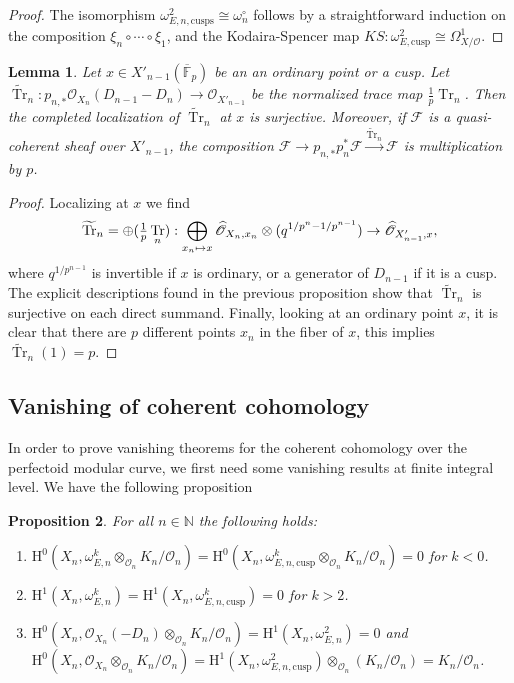 \documentclass[11pt]{article}
\newcommand\mto{\mathchoice{\longmapsto}{\mapsto}{\mapsto}{\mapsto}}
\newcommand{\cusp}{\mathrm{cusp}}
\newcommand{\cusps}{\mathrm{cusps}}
\numberwithin{equation}{section}
\newtheorem{prop}{Proposition}[section]
\newtheorem{lem}[prop]{Lemma}
\theoremstyle{definition}
\newcommand{\bb}[1]{\mathbb{#1}}
\newcommand{\n}[1]{\mathcal{#1}}
\newcommand{\s}[1]{\mathscr{#1}}
\DeclareMathOperator{\Tr}{Tr}
\begin{document}
\begin{proof}
The isomorphism $\omega_{E,n,\cusps}^2\cong \omega_n^\circ$ follows by a straightforward induction on the composition $\xi_n\circ \cdots \circ \xi_{1}$, and the Kodaira-Spencer map $KS: \omega_{E,\cusp}^2\cong \Omega^1_{X/\n{O}}$.
\end{proof}

\begin{lem}
\label{LemmaSurjTrace}
Let $x\in X'_{n-1}(\overline{\bb{F}}_p)$ be an an ordinary point or a cusp. Let $\widetilde{\Tr}_n: p_{n,*}\s{O}_{X_n}(D_{n-1}-D_n)\to \s{O}_{X'_{n-1}}$ be the normalized trace map $\frac{1}{p} \Tr_n$. Then the completed localization of $\widetilde{\Tr}_n$ at $x$ is surjective. Moreover, if $\n{F}$ is a quasi-coherent sheaf over $X'_{n-1}$, the composition $\n{F}\to p_{n,*}p_n^*\n{F}\xrightarrow{\widetilde{\Tr}_n} \n{F}$ is multiplication by $p$.
\end{lem}

\begin{proof}
Localizing at $x$ we find
\[
\widetilde{\Tr}_n= \oplus (\tfrac{1}{p}\Tr_n):\bigoplus_{x_n\mto x} \widehat{\s{O}}_{X_n, x_n}\otimes (q^{1/p^n-1/p^{n-1}}) \to \widehat{\s{O}}_{X'_{n-1}, x},
\]
where $q^{1/p^{n-1}}$ is invertible if $x$ is ordinary, or a generator of $D_{n-1}$ if it is a cusp. The explicit descriptions found in the previous proposition show that $\widetilde{\Tr}_n$ is surjective on each direct summand. Finally, looking at an ordinary point $x$, it is clear that there are $p$ different points $x_n$ in the fiber of $x$, this implies $\widetilde{\Tr}_n(1)=p$.
\end{proof}

\subsection*{Vanishing of coherent cohomology}

In order to prove vanishing theorems for the coherent cohomology over the perfectoid modular curve, we first need some vanishing results at finite integral level. We have the following proposition

\begin{prop}
\label{vanishingNeg}
For all $n\in \bb{N}$ the following holds:

\begin{enumerate}
\item\label{vanishingNeg1} $\mathrm{H}^0(X_n,\omega_{E,n}^k\otimes_{\n{O}_n} K_n/\n{O}_n)=\mathrm{H}^0(X_n, \omega^k_{E,n,\cusp}\otimes_{\n{O}_n} K_n/\n{O}_n)=0$ for $k<0$.

\item\label{vanishingNeg2} $\mathrm{H}^1(X_n,\omega_{E,n}^k)=\mathrm{H}^1(X_n, \omega^k_{E,n,\cusp})=0$ for $k>2$.

\item\label{vanishingNeg3} $\mathrm{H}^0(X_n, \s{O}_{X_n}(-D_n)\otimes_{\n{O}_n} K_n/\n{O}_n)=\mathrm{H}^1(X_n,\omega^2_{E,n})=0$ and $\mathrm{H}^0(X_n, \s{O}_{X_n}\otimes_{\n{O}_n} K_n/\n{O}_n)= \mathrm{H}^1(X_n, \omega^2_{E,n,\cusp})\otimes_{\n{O}_n} (K_n/\n{O}_n)= K_n/\n{O}_n$.
\end{enumerate}
\end{prop}
\end{document}
